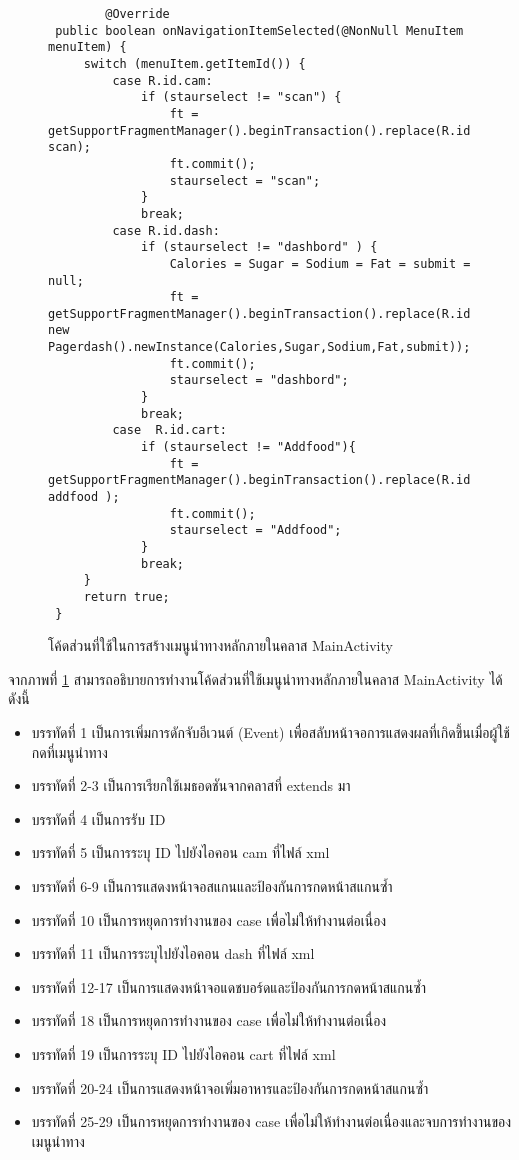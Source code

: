 		\begin{figure}[H]
			{\begin{lstlisting}
        @Override
 public boolean onNavigationItemSelected(@NonNull MenuItem menuItem) {
     switch (menuItem.getItemId()) {
         case R.id.cam:
             if (staurselect != "scan") {
                 ft = getSupportFragmentManager().beginTransaction().replace(R.id.Framefag, scan);
                 ft.commit();
                 staurselect = "scan";
             }
             break;
         case R.id.dash:
             if (staurselect != "dashbord" ) {
                 Calories = Sugar = Sodium = Fat = submit = null;
                 ft = getSupportFragmentManager().beginTransaction().replace(R.id.Framefag, new Pagerdash().newInstance(Calories,Sugar,Sodium,Fat,submit));
                 ft.commit();
                 staurselect = "dashbord";
             }
             break;
         case  R.id.cart:
             if (staurselect != "Addfood"){
                 ft = getSupportFragmentManager().beginTransaction().replace(R.id.Framefag, addfood );
                 ft.commit();
                 staurselect = "Addfood";
             }
             break;
     }
     return true;
 }

				\end{lstlisting}}
			\caption{โค้ดส่วนที่ใช้ในการสร้างเมนูนำทางหลักภายในคลาส MainActivity}
			\label{Fig:MainActivity2}
		\end{figure}
\newpage
		จากภาพที่ \ref{Fig:MainActivity2} สามารถอธิบายการทำงานโค้ดส่วนที่ใช้เมนูนำทางหลักภายในคลาส MainActivity ได้ดังนี้
		\begin{itemize}[label={--}]
			\item บรรทัดที่ 1     เป็นการเพิ่มการดักจับอีเวนต์ (Event) เพื่อสลับหน้าจอการแสดงผลที่เกิดขึ้นเมื่อผู้ใช้กดที่เมนูนำทาง
			\item บรรทัดที่ 2-3   เป็นการเรียกใช้เมธอดชันจากคลาสที่ extends มา
			\item บรรทัดที่ 4     เป็นการรับ ID 
			\item บรรทัดที่ 5    	เป็นการระบุ ID ไปยังไอคอน cam ที่ไฟล์ xml
			\item บรรทัดที่ 6-9 	เป็นการแสดงหน้าจอสแกนและป้องกันการกดหน้าสแกนซ้ำ
			\item บรรทัดที่ 10 		เป็นการหยุดการทำงานของ case เพื่อไม่ให้ทำงานต่อเนื่อง 
			\item บรรทัดที่ 11	  เป็นการระบุไปยังไอคอน dash ที่ไฟล์ xml
			\item บรรทัดที่ 12-17 เป็นการแสดงหน้าจอแดชบอร์ดและป้องกันการกดหน้าสแกนซ้ำ
			\item บรรทัดที่ 18    เป็นการหยุดการทำงานของ case เพื่อไม่ให้ทำงานต่อเนื่อง 
			\item บรรทัดที่ 19    เป็นการระบุ ID ไปยังไอคอน cart ที่ไฟล์ xml
			\item บรรทัดที่ 20-24 เป็นการแสดงหน้าจอเพิ่มอาหารและป้องกันการกดหน้าสแกนซ้ำ
			\item บรรทัดที่ 25-29 เป็นการหยุดการทำงานของ case เพื่อไม่ให้ทำงานต่อเนื่องและจบการทำงานของเมนูนำทาง 
		\end{itemize}
	
